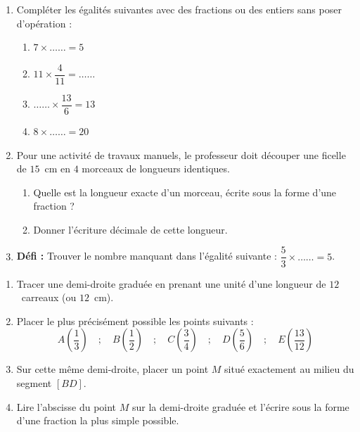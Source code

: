 \documentclass[a4paper]{book}
\begin{document}
    \begin{exercice}
        \begin{enumerate}
            \item Compléter les égalités suivantes avec des fractions ou des entiers sans poser d'opération :
            \begin{enumerate}
                \item $7 \times \ldots\ldots = 5$ \hfill
                \item $11 \times \dfrac{4}{11} = \ldots\ldots$ \hfill
                \item $\ldots\ldots \times \dfrac{13}{6} = 13$ \hfill
                \item $8 \times \ldots\ldots = 20$
            \end{enumerate}
            \vspace{0.2cm}
            \item Pour une activité de travaux manuels, le professeur doit découper une ficelle de $15$~cm en $4$ morceaux de longueurs identiques. 
            \begin{enumerate}
                \item Quelle est la longueur exacte d'un morceau, écrite sous la forme d'une fraction ?
                \item Donner l'écriture décimale de cette longueur.
            \end{enumerate}
            \item \textbf{Défi :} Trouver le nombre manquant dans l'égalité suivante : $\dfrac{5}{3} \times \ldots\ldots = 5$.
        \end{enumerate}
    \end{exercice}
    
    \begin{exercice}
        \begin{enumerate}
            \item Tracer une demi-droite graduée en prenant une unité d'une longueur de $12$~carreaux (ou $12$~cm).
            \item Placer le plus précisément possible les points suivants :
            \[ A\left(\dfrac{1}{3}\right) \quad ; \quad B\left(\dfrac{1}{2}\right) \quad ; \quad C\left(\dfrac{3}{4}\right) \quad ; \quad D\left(\dfrac{5}{6}\right) \quad ; \quad E\left(\dfrac{13}{12}\right) \]
            \item Sur cette même demi-droite, placer un point $M$ situé exactement au milieu du segment $[BD]$. 
            \item Lire l'abscisse du point $M$ sur la demi-droite graduée et l'écrire sous la forme d'une fraction la plus simple possible.
        \end{enumerate}
    \end{exercice}
    
\end{document}
